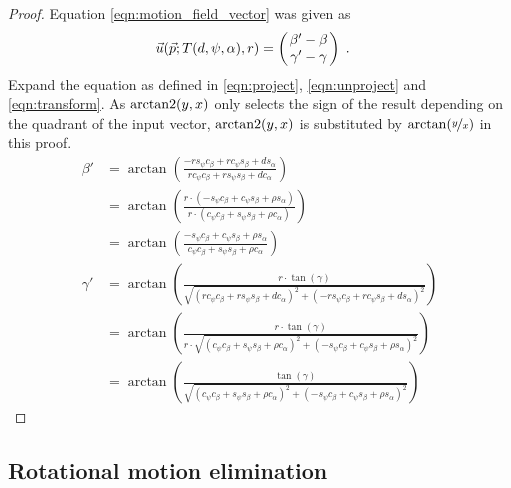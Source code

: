 \begin{proof}
Equation \ref{eqn:motion_field_vector} was given as
\begin{align*}
\vec u(\vec p; T(d, \psi, \alpha), r) &= \begmat
  \beta' - \beta \\
  \gamma' - \gamma
\finmat \; .
\end{align*}
Expand the equation as defined in \ref{eqn:project}, \ref{eqn:unproject} and \ref{eqn:transform}. As $\operatorname{arctan2}(y, x)$ only selects the sign of the result depending on the quadrant of the input vector, $\operatorname{arctan2}(y, x)$ is substituted by $\arctan(\nicefrac{y}x)$ in this proof.
\begin{align*}
\beta' &= \arctan
    \left(
      \frac{
	- r s_{\psi} c_\beta + r c_{\psi} s_\beta + d s_{\alpha}
      }{
          r c_{\psi} c_\beta + r s_{\psi} s_\beta + d c_{\alpha}
      }
    \right) \\
    &= \arctan
    \left(
      \frac{
	  r \cdot (-s_{\psi} c_\beta + c_{\psi} s_\beta + \rho s_{\alpha} )
      }{
          r \cdot ( c_{\psi} c_\beta + s_{\psi} s_\beta + \rho c_{\alpha} )
      }
    \right) \\
    &= \arctan
    \left(
      \frac{
	  -s_{\psi} c_\beta + c_{\psi} s_\beta + \rho s_{\alpha}
      }{
          c_{\psi} c_\beta + s_{\psi} s_\beta + \rho c_{\alpha}
      }
    \right) \\
\gamma' &= \arctan
    \left(
      \frac{
	r \cdot \tan(\gamma)
      }{
	\sqrt{
	  (  r c_{\psi} c_\beta + r s_{\psi} s_\beta + d c_{\alpha})^{2} +
	  (- r s_{\psi} c_\beta + r c_{\psi} s_\beta + d s_{\alpha})^{2}}
      }
    \right) \\
    &= \arctan
    \left(
      \frac{
	r \cdot \tan(\gamma)
      }{
	r \cdot \sqrt{
	  (  c_{\psi} c_\beta + s_{\psi} s_\beta + \rho c_{\alpha})^{2} +
	  (- s_{\psi} c_\beta + c_{\psi} s_\beta + \rho s_{\alpha})^{2}}
      }
    \right)\\
    &= \arctan
    \left(
      \frac{
	\tan(\gamma)
      }{
	\sqrt{
	  (  c_{\psi} c_\beta + s_{\psi} s_\beta + \rho c_{\alpha})^{2} +
	  (- s_{\psi} c_\beta + c_{\psi} s_\beta + \rho s_{\alpha})^{2}}
      }
    \right)
\end{align*}
\end{proof}

\subsection{Rotational motion elimination}

\label{proof:rot_motion_elim}

